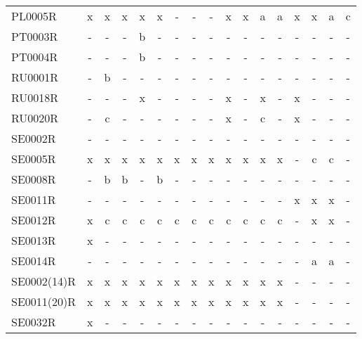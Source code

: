 \begin{table}
{{\begin{tabular}{l|cccccccccccccccc}
        PL0005R &  x &   x &    x &      x &   x &    - &    - &    - &      x &    x &    a &   a &      x &    x &    a &     c \\
        PT0003R &  - &   - &    - &      b &   - &    - &    - &    - &      - &    - &    - &   - &      - &    - &    - &     - \\
        PT0004R &  - &   - &    - &      b &   - &    - &    - &    - &      - &    - &    - &   - &      - &    - &    - &     - \\
        RU0001R &  - &   b &    - &      - &   - &    - &    - &    - &      - &    - &    - &   - &      - &    - &    - &     - \\
        RU0018R &  - &   - &    - &      x &   - &    - &    - &    - &      x &    - &    x &   - &      x &    - &    - &     - \\
        RU0020R &  - &   c &    - &      - &   - &    - &    - &    - &      x &    - &    c &   - &      x &    - &    - &     - \\
        SE0002R &  - &   - &    - &      - &   - &    - &    - &    - &      - &    - &    - &   - &      - &    - &    - &     - \\
        SE0005R &  x &   x &    x &      x &   x &    x &    x &    x &      x &    x &    x &   x &      - &    c &    c &     - \\
        SE0008R &  - &   b &    b &      - &   b &    - &    - &    - &      - &    - &    - &   - &      - &    - &    - &     - \\
        SE0011R &  - &   - &    - &      - &   - &    - &    - &    - &      - &    - &    - &   - &      x &    x &    x &     - \\
        SE0012R &  x &   c &    c &      c &   c &    c &    c &    c &      c &    c &    c &   c &      - &    x &    x &     - \\
        SE0013R &  x &   - &    - &      - &   - &    - &    - &    - &      - &    - &    - &   - &      - &    - &    - &     - \\
        SE0014R &  - &   - &    - &      - &   - &    - &    - &    - &      - &    - &    - &   - &      - &    a &    a &     - \\
SE0002(14)R &  x &   x &    x &      x &   x &    x &    x &    x &      x &    x &    x &   x &      - &    - &    - &     - \\
SE0011(20)R &  x &   x &    x &      x &   x &    x &    x &    x &      x &    x &    x &   x &      - &    - &    - &     - \\
        SE0032R &  x &   - &    - &      - &   - &    - &    - &    - &      - &    - &    - &   - &      - &    - &    - &     - \\

\end{tabular}}}
\end{table}
